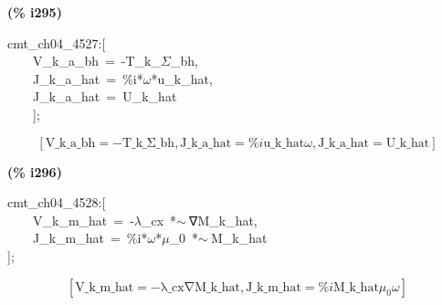 \documentclass[fleqn]{article}
\begin{document}
\noindent
\begin{minipage}[t]{4.000000em}\color{red}\bfseries
(\% i295)	
\end{minipage}
\begin{minipage}[t]{\textwidth}\color{blue}
cmt\_ch04\_4527:[\\
\ \ \ \ V\_k\_a\_bh\ =\ -T\_k\_\ensuremath{\Sigma}\_bh,\\
\ \ \ \ J\_k\_a\_hat\ =\ \%i*\ensuremath{\omega}*u\_k\_hat,\ \\
\ \ \ \ J\_k\_a\_hat\ =\ U\_k\_hat\\
\ \ \ \ ];
\end{minipage}
\[\displaystyle \tag{\% o295} 
\left[ \ensuremath{\mathrm{V\_ k\_ a\_ bh}}=-\ensuremath{\mathrm{T\_ k\_ \Sigma \_ bh}}\operatorname{,}\ensuremath{\mathrm{J\_ k\_ a\_ hat}}=\% i \ensuremath{\mathrm{u\_ k\_ hat}} \omega \operatorname{,}\ensuremath{\mathrm{J\_ k\_ a\_ hat}}=\ensuremath{\mathrm{U\_ k\_ hat}}\right] \mbox{}
\]


\noindent
\begin{minipage}[t]{4.000000em}\color{red}\bfseries
(\% i296)	
\end{minipage}
\begin{minipage}[t]{\textwidth}\color{blue}
cmt\_ch04\_4528:[\\
\ \ \ \ V\_k\_m\_hat\ =\ -\ensuremath{\lambda}\_cx\ *\ensuremath{\sim\ }∇M\_k\_hat,\\
\ \ \ \ J\_k\_m\_hat\ =\ \%i*\ensuremath{\omega}*\ensuremath{\mu}\_0\ *\ensuremath{\sim\ }M\_k\_hat\\
];
\end{minipage}
\[\displaystyle \tag{\% o296} 
\left[ \ensuremath{\mathrm{V\_ k\_ m\_ hat}}=-\ensuremath{\mathrm{\lambda \_ cx}} \ensuremath{\mathrm{∇M\_ k\_ hat}}\operatorname{,}\ensuremath{\mathrm{J\_ k\_ m\_ hat}}=\% i \ensuremath{\mathrm{M\_ k\_ hat}} {{\mu }_0} \omega \right] \mbox{}
\]
\end{document}

